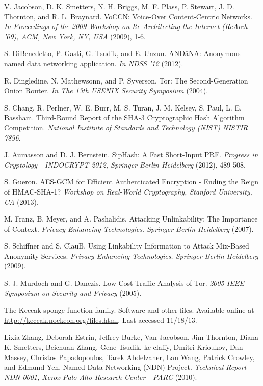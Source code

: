 \documentclass[10pt]{article}
\begin{document}
\begin{thebibliography}{[MT1]}

 V. Jacobson, D. K. Smetters, N. H. Briggs, M. F. Plass, P. Stewart, J. D. Thornton, and R. L. Braynard. VoCCN: Voice-Over Content-Centric Networks. \emph{In Proceedings of the 2009 Workshop on Re-Architecting the Internet (ReArch '09), ACM, New York, NY, USA} (2009), 1-6. 

 S. DiBenedetto, P. Gasti, G. Tsudik, and E. Unzun. {\sf AND\=aNA}: Anonymous named data networking application. \emph{In NDSS '12} (2012).

 R. Dingledine, N. Mathewsonn, and P. Syverson. Tor: The Second-Generation Onion Router. \emph{In The 13th USENIX Security Symposium} (2004).

 S. Chang, R. Perlner, W. E. Burr, M. S. Turan, J. M. Kelsey, S. Paul, L. E. Bassham. Third-Round Report of the SHA-3 Cryptographic Hash Algorithm Competition. \emph{National Institute of Standards and Technology (NIST) NISTIR 7896}.

 J. Aumasson and D. J. Bernstein. SipHash: A Fast Short-Input PRF. \emph{Progress in Cryptology - INDOCRYPT 2012, Springer Berlin Heidelberg} (2012), 489-508.

 S. Gueron. AES-GCM for Efficient Authenticated Encryption - Ending the Reign of HMAC-SHA-1? \emph{Workshop on Real-World Cryptography, Stanford University, CA} (2013).

 M. Franz, B. Meyer, and A. Pashalidis. Attacking Unlinkability: The Importance of Context. \emph{Privacy Enhancing Technologies. Springer Berlin Heidelberg} (2007).

 S. Schiffner and S. ClauB. Using Linkability Information to Attack Mix-Based Anonymity Services. \emph{Privacy Enhancing Technologies. Springer Berlin Heidelberg} (2009).

 S. J. Murdoch and G. Danezis. Low-Cost Traffic Analysis of Tor. \emph{2005 IEEE Symposium on Security and Privacy} (2005).

 The Keccak sponge function family. Software and other files. Available online at \url{http://keccak.noekeon.org/files.html}. Last accessed 11/18/13.

 Lixia Zhang, Deborah Estrin, Jeffrey Burke, Van Jacobson, Jim Thornton, Diana K. Smetters, Beichuan Zhang, Gene Tsudik, kc claffy, Dmitri Krioukov, Dan Massey, Christos Papadopoulos, Tarek Abdelzaher, Lan Wang, Patrick Crowley, and Edmund Yeh. Named Data Networking (NDN) Project. \emph{Technical Report NDN-0001, Xerox Palo Alto Research Center - PARC} (2010).


\end{thebibliography}
\end{document}
